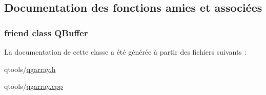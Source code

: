 \subsection{Documentation des fonctions amies et associées}
\hypertarget{class_q_g_array_a6e20d98ed3f0cea33e4221e417f1a021}{}
\subsubsection[{Q\+Buffer}]{\setlength{\rightskip}{0pt plus 5cm}friend class {\bf Q\+Buffer}\hspace{0.3cm}{\ttfamily [friend]}}\label{class_q_g_array_a6e20d98ed3f0cea33e4221e417f1a021}


La documentation de cette classe a été générée à partir des fichiers suivants \+:\begin{DoxyCompactItemize}
\item 
qtools/\hyperlink{qgarray_8h}{qgarray.\+h}\item 
qtools/\hyperlink{qgarray_8cpp}{qgarray.\+cpp}\end{DoxyCompactItemize}
